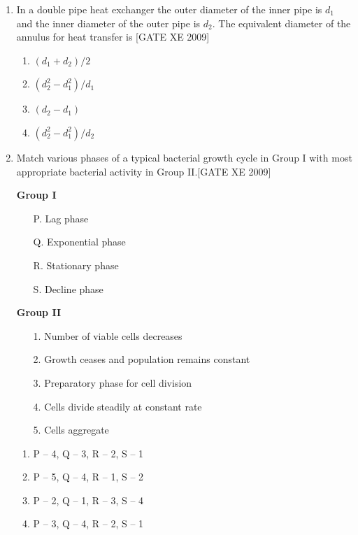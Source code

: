\documentclass[journal,12pt,onecolumn]{IEEEtran}
\theoremstyle{remark}
\begin{document}
\begin{enumerate}
\item In a double pipe heat exchanger the outer diameter of the inner pipe is $d_1$ and the inner diameter of the outer pipe is $d_2$. The equivalent diameter of the annulus for heat transfer is
\hfill[GATE XE 2009]
\begin{multicols}{2}
\begin{enumerate}
\item $(d_1 + d_2)/2$
\item $(d_2^2 - d_1^2)/d_1$
\item $(d_2 - d_1)$
\item $(d_2^2 - d_1^2)/d_2$
\end{enumerate}
\end{multicols}

\item Match various phases of a typical bacterial growth cycle in Group I with most appropriate bacterial activity in Group II.\hfill[GATE XE 2009]

\begin{minipage}[t]{0.45\textwidth}
\textbf{Group I}
\begin{itemize}
  \item[P.] Lag phase
  \item[Q.] Exponential phase
  \item[R.] Stationary phase
  \item[S.] Decline phase
\end{itemize}
\end{minipage}
\hfill
\begin{minipage}[t]{0.45\textwidth}
\textbf{Group II}
\begin{itemize}
  \item[1.] Number of viable cells decreases
  \item[2.] Growth ceases and population remains constant
  \item[3.] Preparatory phase for cell division
  \item[4.] Cells divide steadily at constant rate
  \item[5.] Cells aggregate
\end{itemize}
\end{minipage}


\begin{multicols}{2}
\begin{enumerate}
\item P -- 4, Q -- 3, R -- 2, S -- 1
\item P -- 5, Q -- 4, R -- 1, S -- 2
\item P -- 2, Q -- 1, R -- 3, S -- 4
\item P -- 3, Q -- 4, R -- 2, S -- 1
\end{enumerate}
\end{multicols}


\end{enumerate}
\end{document}

